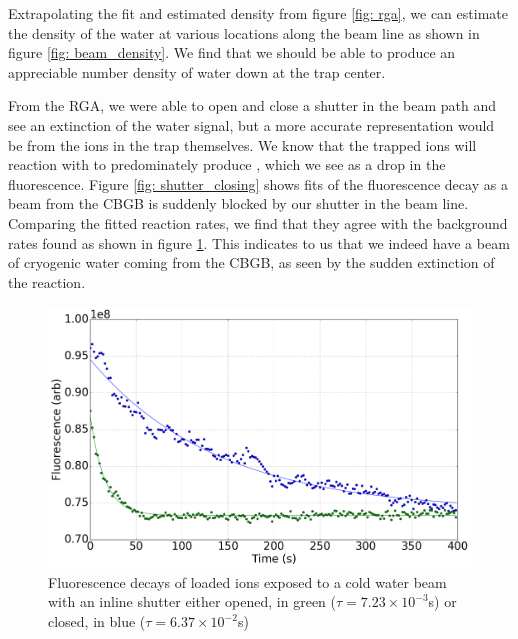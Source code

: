 Extrapolating the fit and estimated density from figure \ref{fig: rga}, we can estimate the density of the water at various locations along the beam line as shown in figure \ref{fig: beam_density}. We find that we should be able to produce an appreciable number density of water down at the trap center.

From the RGA, we were able to open and close a shutter in the beam path and see an extinction of the water signal, but a more accurate representation would be from the ions in the trap themselves. We know that the trapped  ions will reaction with  to predominately produce , which we see as a drop in the fluorescence. Figure \ref{fig: shutter_closing} shows fits of the fluorescence decay as a beam from the CBGB is suddenly blocked by our shutter in the beam line. Comparing the fitted reaction rates, we find that they agree with the background rates found as shown in figure \ref{fig: shutter_bkg}. This indicates to us that we indeed have a beam of cryogenic water coming from the CBGB, as seen by the sudden extinction of the  reaction.

\begin{figure}[H] \label{fig: shutter_bkg}
	\centering
	\includegraphics[width=1\textwidth]{images/CBGB_sudden_shutter_flow_bkg.png}
	\caption{Fluorescence decays of loaded  ions exposed to a cold water beam with an inline shutter either opened, in green ($\tau = 7.23 \times 10^{-3}$s) or closed, in blue ($\tau = 6.37 \times 10^{-2}$s)}
\end{figure}

